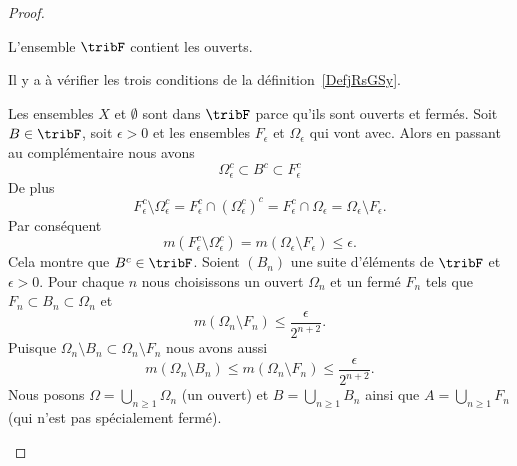 \begin{proof}
\begin{subproof}
		L'ensemble \( \tribF\) contient les ouverts.

		Il y a à vérifier les trois conditions de la définition~\ref{DefjRsGSy}.
		\begin{subproof}
			Les ensembles \( X\) et \( \emptyset\) sont dans \( \tribF\) parce qu'ils sont ouverts et fermés.
			\spitem[Complémentaire]
			Soit \( B\in \tribF\), soit \( \epsilon>0\) et les ensembles \( F_{\epsilon} \) et \( \Omega_{\epsilon}\) qui vont avec. Alors en passant au complémentaire nous avons
			\begin{equation}
				\Omega_{\epsilon}^c\subset B^c\subset F_{\epsilon}^c
			\end{equation}
			De plus
			\begin{equation}
				F_{\epsilon}^c\setminus \Omega_{\epsilon}^c=F_{\epsilon}^c\cap(\Omega_{\epsilon}^c)^c=F_{\epsilon}^c\cap \Omega_{\epsilon}=\Omega_{\epsilon}\setminus F_{\epsilon}.
			\end{equation}
			Par conséquent
			\begin{equation}
				m(F_{\epsilon}^c\setminus \Omega_{\epsilon}^c)=m(\Omega_{\epsilon}\setminus F_{\epsilon})\leq \epsilon.
			\end{equation}
			Cela montre que \( B^c\in \tribF\).
			Soient \( (B_n)\) une suite d'éléments de \( \tribF\) et \( \epsilon>0\). Pour chaque \( n\) nous choisissons un ouvert \( \Omega_n\) et un fermé \( F_n\) tels que \( F_n\subset  B_n\subset \Omega_n\) et
			\begin{equation}
				m(\Omega_n\setminus F_n)\leq \frac{ \epsilon }{ 2^{n+2} }.
			\end{equation}
			Puisque \( \Omega_n\setminus B_n\subset \Omega_n\setminus F_n\) nous avons aussi
			\begin{equation}
				m(\Omega_n\setminus B_n)\leq m(\Omega_n\setminus F_n)\leq \frac{ \epsilon }{ 2^{n+2} }.
			\end{equation}
			Nous posons \( \Omega=\bigcup_{n\geq 1}\Omega_n\) (un ouvert) et \( B=\bigcup_{n\geq 1}B_n\) ainsi que \( A=\bigcup_{n\geq 1}F_n\) (qui n'est pas spécialement fermé).


\end{subproof}
\end{subproof}
\end{proof}
